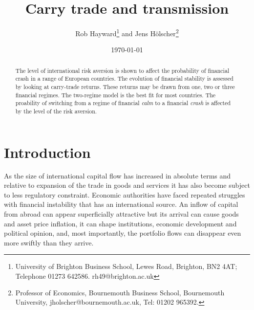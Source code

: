 \documentclass[12pt, a4paper, oneside]{article} %
\begin{document}
\title{Carry trade and transmission}
\author{Rob Hayward\footnote{University of Brighton Business School, Lewes Road, Brighton, BN2 4AT; Telephone 01273 642586.  rh49@brighton.ac.uk} and  Jens H\"{o}lscher\footnote{Professor of Economics, Bournemouth Business School, Bournemouth University, jholscher@bournemouth.ac.uk, Tel: 01202 965392.}} 
\date{\today}
\maketitle
\begin{abstract}
The level of international risk aversion is shown to affect the probability of financial crash in a range of European countries.  The evolution of financial stability is assessed by looking at carry-trade  returns.  These returns may be drawn from one, two or three financial regimes.  The two-regime model is the best fit for most countries.  The proability of switching from a regime of financial \emph{calm} to a financial \emph{crash} is affected by the level of the risk aversion.   
\end{abstract}

\section{Introduction}
As the size of international capital flow has increased in absolute terms and relative to expansion of the trade in goods and services it has also become subject to less regulatory constraint. Economic authorities have faced repeated struggles with financial instability that has an international source.  An inflow of capital from abroad can appear superficially attractive but its arrival can cause goods and asset price inflation, it can shape institutions, economic development and political opinion, and, most importantly, the portfolio flows can disappear even more swiftly than they arrive.  %
\end{document}
